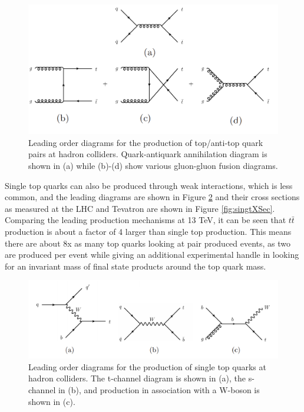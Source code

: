 \begin{figure}[h!]
	\centering
	\includegraphics[width=\columnwidth]{../ThesisImages/Theory/LOPairProdDiags.png}
	\caption[Leading order diagrams for $t\bar{t}$ production at hadron colliders.]{Leading order diagrams for the production of top/anti-top quark pairs at hadron colliders.  Quark-antiquark annihilation diagram is shown in (a) while (b)-(d) show various gluon-gluon fusion diagrams.}
	\label{fig:LOprod}
\end{figure}

Single top quarks can also be produced through weak interactions, which is less common, and the leading diagrams are shown in Figure \ref{fig:LOprodSing} and their cross sections as measured at the LHC and Tevatron are shown in Figure \ref{fig:singtXSec}.  Comparing the leading production mechanisms at 13 TeV, it can be seen that $t\bar{t}$ production is about a factor of 4 larger than single top production.  This means there are about 8x as many top quarks looking at pair produced events, as two are produced per event while giving an additional experimental handle in looking for an invariant mass of final state products around the top quark mass.

\begin{figure}[h!]
	\centering
	\includegraphics[width=\columnwidth]{../ThesisImages/Theory/LOSingProdDiags.png}
	\caption[Leading order diagrams for single top quark production.]{Leading order diagrams for the production of single top quarks at hadron colliders.  The t-channel diagram is shown in (a), the s-channel in (b), and production in association with a W-boson is shown in (c).}
	\label{fig:LOprodSing}
\end{figure}

